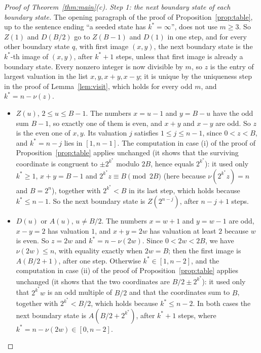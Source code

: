 \documentclass[11pt]{amsart}
\theoremstyle{definition}
\theoremstyle{remark}
\newcommand{\vt}{\nu}
\begin{document}
\begin{proof}[Proof of Theorem~\ref{thm:main}\textup{(c)}]
\emph{Step 1: the next boundary state of each boundary state.} The opening paragraph of the proof of Proposition~\ref{prop:table}, up to the sentence ending ``a seeded state has $k^*=\infty$'', does not use $m\ge3$. So $Z(1)$ and $D(B/2)$ go to $Z(B-1)$ and $D(1)$ in one step, and for every other boundary state $q$, with first image $(x,y)$, the next boundary state is the $k^*$-th image of $(x,y)$, after $k^*+1$ steps, unless that first image is already a boundary state. Every nonzero integer is now divisible by $m$, so $z$ is the entry of largest valuation in the list $x,y,x+y,x-y$; it is unique by the uniqueness step in the proof of Lemma~\ref{lem:visit}, which holds for every odd $m$, and $k^*=n-\vt(z)$.
\begin{itemize}
\item $Z(u)$, $2\le u\le B-1$. The numbers $x=u-1$ and $y=B-u$ have the odd sum $B-1$, so exactly one of them is even, and $x+y$ and $x-y$ are odd. So $z$ is the even one of $x,y$. Its valuation $j$ satisfies $1\le j\le n-1$, since $0<z<B$, and $k^*=n-j$ lies in $[1,n-1]$. The computation in case (i) of the proof of Proposition~\ref{prop:table} applies unchanged (it shows that the surviving coordinate is congruent to $\pm2^{k^*}$ modulo $2B$, hence equals $2^{k^*}$): it used only $k^*\ge1$, $x+y=B-1$ and $2^{k^*}z\equiv B\pmod{2B}$ (here because $\vt(2^{k^*}z)=n$ and $B=2^n$), together with $2^{k^*}<B$ in its last step, which holds because $k^*\le n-1$. So the next boundary state is $Z(2^{n-j})$, after $n-j+1$ steps.
\item $D(u)$ or $A(u)$, $u\ne B/2$. The numbers $x=w+1$ and $y=w-1$ are odd, $x-y=2$ has valuation $1$, and $x+y=2w$ has valuation at least $2$ because $w$ is even. So $z=2w$ and $k^*=n-\vt(2w)$. Since $0<2w<2B$, we have $\vt(2w)\le n$, with equality exactly when $2w=B$; then the first image is $A(B/2+1)$, after one step. Otherwise $k^*\in[1,n-2]$, and the computation in case (ii) of the proof of Proposition~\ref{prop:table} applies unchanged (it shows that the two coordinates are $B/2\pm2^{k^*}$): it used only that $2^{k^*}w$ is an odd multiple of $B/2$ and that the coordinates sum to $B$, together with $2^{k^*}<B/2$, which holds because $k^*\le n-2$. In both cases the next boundary state is $A(B/2+2^{k^*})$, after $k^*+1$ steps, where $k^*=n-\vt(2w)\in[0,n-2]$.
\end{itemize}


\end{proof}
\end{document}
